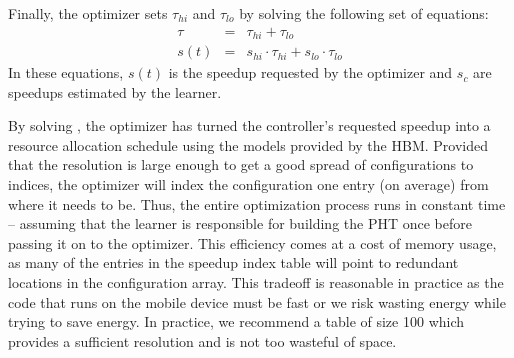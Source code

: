 
Finally, the optimizer sets $\tau_{hi}$ and $\tau_{lo}$ by solving the
following set of equations:
\begin{eqnarray}
  \tau &=& \tau_{hi} + \tau_{lo}    \label{eqn:s1} \\
  s(t) &=& s_{hi} \cdot \tau_{hi} + s_{lo} \cdot \tau_{lo} \label{eqn:s2} 
\end{eqnarray}
In these equations, $s(t)$ is the speedup requested by the optimizer
and $s_c$ are speedups estimated by the learner.

By solving , the optimizer has turned the controller's
requested speedup into a resource allocation schedule using the models
provided by the HBM.  Provided that the resolution is large enough to
get a good spread of configurations to indices, the optimizer will
index the configuration one entry (on average) from where it needs to
be.  Thus, the entire optimization process runs in constant time --
assuming that the learner is responsible for building the PHT once
before passing it on to the optimizer.  This efficiency comes at a
cost of memory usage, as many of the entries in the speedup index
table will point to redundant locations in the configuration array.
This tradeoff is reasonable in practice as the code that runs on the
mobile device must be fast or we risk wasting energy while trying to
save energy.  In practice, we recommend a table of size 100 which
provides a sufficient resolution and is not too wasteful of space.






